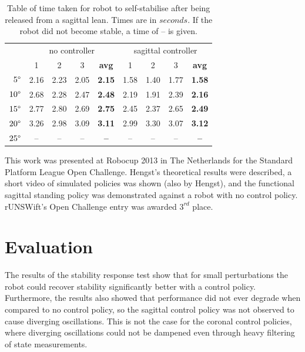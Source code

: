 \begin{table}[h]
  \centering
    \begin{tabular}{ r|cccc|cccc| }
    \multicolumn{1}{r}{}
     &  \multicolumn{4}{c}{no controller}
     & \multicolumn{4}{c}{sagittal controller} \\
    \multicolumn{1}{r}{}
     &  \multicolumn{1}{c}{1}
     &  \multicolumn{1}{c}{2}
     &  \multicolumn{1}{c}{3}
     &  \multicolumn{1}{c}{\textbf{avg}}
     &  \multicolumn{1}{c}{1}
     &  \multicolumn{1}{c}{2}
     &  \multicolumn{1}{c}{3}
     &  \multicolumn{1}{c}{\textbf{avg}} \\
    \cline{2-9}
    $5\degree$ & 2.16 & 2.23 & 2.05 & \textbf{2.15} & 1.58 & 1.40 & 1.77 & \textbf{1.58} \\
    $10\degree$ & 2.68 & 2.28 & 2.47 & \textbf{2.48} & 2.19 & 1.91 & 2.39 & \textbf{2.16} \\
    $15\degree$ & 2.77 & 2.80 & 2.69 & \textbf{2.75} & 2.45 & 2.37 & 2.65 & \textbf{2.49} \\
    $20\degree$ & 3.26 & 2.98 & 3.09 & \textbf{3.11} & 2.99 & 3.30 & 3.07 & \textbf{3.12} \\
    $25\degree$ & -- & -- & -- & \textbf{--} & -- & -- & -- & \textbf{--} \\
    \cline{2-9}
    \cline{2-9}
    \end{tabular}
  \caption{Table of time taken for robot to self-stabilise after being released from a sagittal lean. Times are in $seconds$. If the robot did not become stable, a time of -- is given.}
  \label{tab:results}
\end{table}

This work was presented at Robocup 2013 in The Netherlands for the Standard Platform League Open Challenge. Hengst's theoretical results\cite{bernhard_rl} were described, a short video of simulated policies was shown (also by Hengst), and the functional sagittal standing policy was demonstrated against a robot with no control policy. rUNSWift's Open Challenge entry was awarded $3^{rd}$ place.

\section{Evaluation}

The results of the stability response test show that for small perturbations the robot could recover stability significantly better with a control policy. Furthermore, the results also showed that performance did not ever degrade when compared to no control policy, so the sagittal control policy was not observed to cause diverging oscillations. This is not the case for the coronal control policies, where diverging oscillations could not be dampened even through heavy filtering of state measurements.


